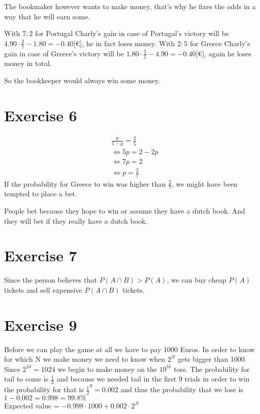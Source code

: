 The bookmaker however wants to make money, that's why he fixes the odds in a way that he will earn some.

With $7 : 2$ for Portugal Charly's gain in case of Portugal's victory will be $4.90 \cdot \frac{2}{7} - 1.80 = -0.40 {[}\euro{]}$, he in fact loses money.
With $2 : 5$ for Greece Charly's gain in case of Greece's victory will be $1.80 \cdot \frac{5}{2} - 4.90 = -0.40 {[}\euro{]}$, again he loses money in total.

So the bookkeeper would always win some money.

\section*{Exercise 6}
\begin{align*}
& \frac{p}{1-p} = \frac{2}{5}\\
& \Leftrightarrow 5p = 2 - 2p\\
& \Leftrightarrow 7p = 2\\
& \Leftrightarrow p = \frac{2}{7}
\end{align*}
If the probability for Greece to win was higher than $\frac{2}{7}$, we might have been tempted to place a bet.

People bet because they hope to win or assume they have a dutch book. And they will bet if they really have a dutch book.

\section*{Exercise 7}
Since the person believes that $P(A\cap B)>P(A)$, we can buy cheap $P(A)$ tickets and sell expensive $P(A\cap B)$ tickets.


\section*{Exercise 9}
Before we can play the game at all we have to pay 1000 Euros. In order to know for which N we make money we need to know when $2^{N}$ gets bigger than 1000. Since $2^{10} = 1024$ we begin to make money on the $10^{th}$ toss.
The probability for tail to come is $\frac{1}{2}$ and because we needed tail in the first 9 trials in order to win the probability for that is $\frac{1}{2}^{9} = 0.002$ and thus the probability that we lose is $1-0.002 = 0.998 = 99.8\%$ \\
Expected value = $-0.998\cdot 1000 + 0.002\cdot 2^{N}$ 

